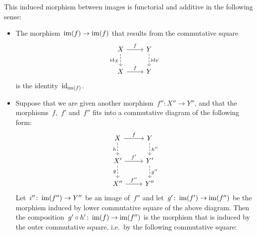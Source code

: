 \begin{remark*}
\begin{enumerate}
      This induced morphism between images is functorial and additive in the following sense:
      \begin{itemize}
        \item
          The morphism~$\operatorname{im}(f) \to \operatorname{im}(f)$ that results from the commutative square
          \[
            \begin{tikzcd}
                X
                \arrow{r}[above]{f}
                \arrow[dashed]{d}[left]{\id_X}
              & Y
                \arrow[dashed]{d}[right]{\id_Y}
              \\
                X
                \arrow{r}[above]{f}
              & Y
            \end{tikzcd}
          \]
          is the identity~$\operatorname{id}_{\operatorname{im}(f)}$.
        \item
          Suppose that we are given another morphism~$f'' \colon X'' \to Y''$, and that the morphisms~$f$,~$f'$ and~$f''$ fits into a commutative diagram of the following form:
          \[
            \begin{tikzcd}
                X
                \arrow{r}[above]{f}
                \arrow[dashed]{d}[left]{h}
              & Y
                \arrow[dashed]{d}[right]{h''}
              \\
                X'
                \arrow{r}[above]{f'}
                \arrow[dashed]{d}[left]{g}
              & Y'
                \arrow[dashed]{d}[right]{g''}
              \\
                X''
                \arrow{r}[above]{f''}
              & Y''
            \end{tikzcd}
          \]
          Let~$i'' \colon \operatorname{im}(f'') \to Y''$ be an image of~$f''$ and let~$g' \colon \operatorname{im}(f') \to \operatorname{im}(f'')$ be the morphism induced by lower commutative square of the above diagram.
          Then the composition~$g' \circ h' \colon \operatorname{im}(f) \to \operatorname{im}(f'')$ is the morphism that is induced by the outer commutative square, i.e.\ by the following commutative square:

\end{itemize}
\end{enumerate}
\end{remark*}
